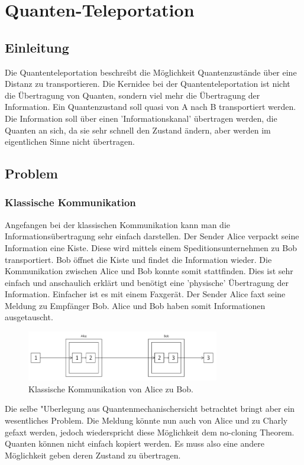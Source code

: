 \chapter{Quanten-Teleportation\label{chapter:teleport}}
\begin{refsection}

\section{Einleitung}
Die Quantenteleportation beschreibt die Möglichkeit Quantenzustände über eine Distanz zu transportieren. Die Kernidee bei der Quantenteleportation ist nicht die Übertragung von Quanten, sondern viel mehr die Übertragung der Information. Ein Quantenzustand soll quasi von A nach B transportiert werden. Die Information soll über einen 'Informationskanal' übertragen werden, die Quanten an sich, da sie sehr schnell den Zustand ändern, aber werden im eigentlichen Sinne nicht übertragen.

\section{Problem}
\subsection{Klassische Kommunikation}
Angefangen bei der klassischen Kommunikation kann man die Informationsübertragung sehr einfach darstellen. Der Sender Alice verpackt seine Information eine Kiste. Diese wird mittels einem Speditionsunternehmen zu Bob transportiert. Bob öffnet die Kiste und findet die Information wieder. Die Kommunikation zwischen Alice und Bob konnte somit stattfinden. Dies ist sehr einfach und anschaulich erklärt und benötigt eine 'physische' Übertragung der Information. Einfacher ist es mit einem Faxgerät. Der Sender Alice faxt seine Meldung zu Empfänger Bob. Alice und Bob haben somit Informationen ausgetauscht.
\begin{figure}
\center
\includegraphics[width=0.75\textwidth]{teleport/image/classic_communication.png}
\caption{Klassische Kommunikation von Alice zu Bob.}
\label{Klassische Kommunikation}
\end{figure}
Die selbe "Uberlegung aus Quantenmechanischersicht betrachtet bringt aber ein wesentliches Problem. Die Meldung könnte nun auch von Alice und zu Charly gefaxt werden, jedoch wiederspricht diese Möglichkeit dem no-cloning Theorem. Quanten können nicht einfach kopiert werden. Es muss also eine andere Möglichkeit geben deren Zustand zu übertragen.

\end{refsection}
